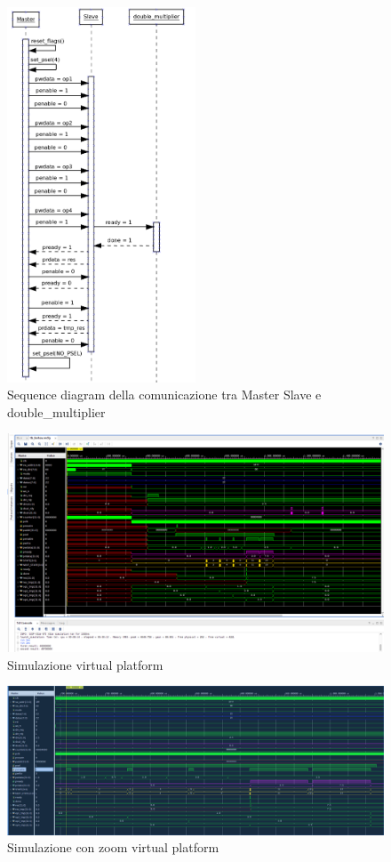 \documentclass[]{IEEEtran}
\begin{document}
\begin{figure}[bt]
    \centering
    \includegraphics[width=0.5\textwidth]{figures/seq_diagram.png}
    \caption{Sequence diagram della comunicazione tra Master Slave e double\_multiplier}
    \label{fig:SEQ_DIAGRAM}
\end{figure}

\begin{figure}[bt]
    \centering
    \includegraphics[width=\textwidth]{figures/sim.png}
    \caption{Simulazione virtual platform}
    \label{fig:SIM}
\end{figure}

\begin{figure}[bt]
    \centering
    \includegraphics[width=\textwidth]{figures/sim_zoom.png}
    \caption{Simulazione con zoom virtual platform}
    \label{fig:SIM_ZOOM}
\end{figure}
\end{document}
